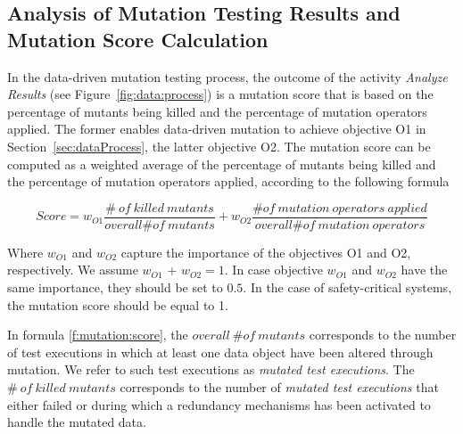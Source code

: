 
\newcommand{\ONMO}{\mathit{overall}\ \# \mathit{of}\ \mathit{mutation} \ \mathit{operators}}
\newcommand{\NMOA}{\# \mathit{of}\ \mathit{mutation} \ \mathit{operators} \ \mathit{applied}}


\subsection{Analysis of Mutation Testing Results and Mutation Score Calculation}
\label{sec:data:mutationscore}

In the data-driven mutation testing process, the outcome of the activity \emph{Analyze Results} (see Figure~\ref{fig:data:process}) is a mutation score that is based on
the percentage of mutants being killed and the percentage of mutation operators applied. 
The former enables data-driven mutation to achieve objective O1 in Section~\ref{sec:dataProcess}, the latter objective O2. 
The mutation score can be computed as a weighted average of the percentage of mutants being killed and the percentage of mutation operators applied, according to the following formula

\begin{equation}
Score=w_{O1} \frac{\# \ \mathit{of}\ \mathit{killed} \ \mathit{mutants}}{\mathit{overall} \# \mathit{of}\ \mathit{mutants}} + w_{O2} \frac{\# \mathit{of}\ \mathit{mutation} \ \mathit{operators} \ \mathit{applied}}{\mathit{overall} \# \mathit{of}\ \mathit{mutation} \ \mathit{operators}}
\label{f:mutation:score}
\end{equation}

Where $w_{O1}$ and $w_{O2}$ capture the importance of the objectives O1 and O2, respectively. We assume $w_{O1}$ + $w_{O2} = 1$. In case objective $w_{O1}$ and $w_{O2}$ have the same importance, they should be set to $0.5$. In the case of safety-critical systems, the mutation score should be equal to 1.

In formula \ref{f:mutation:score}, the $\mathit{overall}\ \# \mathit{of}\ \mathit{mutants}$ corresponds to the number of test executions in which at least one data object have been altered through mutation. We refer to such test executions as \emph{mutated test executions}.
The $\# \ \mathit{of}\ \mathit{killed} \ \mathit{mutants}$ corresponds to the number of \emph{mutated test executions} that either failed or during which a redundancy mechanisms has been activated to handle the mutated data.

